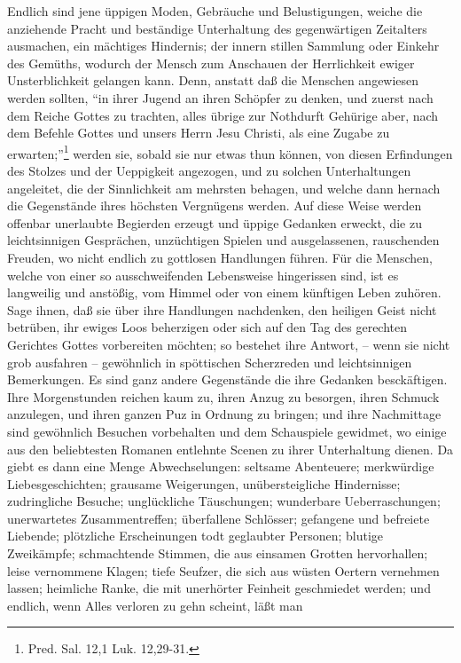 Endlich sind jene üppigen Moden, Gebräuche und Belustigungen, weiche die
anziehende Pracht und beständige Unterhaltung des gegenwärtigen Zeitalters
ausmachen, ein mächtiges Hindernis; der innern stillen Sammlung oder Einkehr des
Gemüths, wodurch der Mensch zum Anschauen der Herrlichkeit ewiger
Unsterblichkeit gelangen kann. Denn, anstatt daß die Menschen angewiesen werden
sollten, "`in ihrer Jugend an ihren Schöpfer zu denken, und zuerst nach dem
Reiche Gottes zu trachten, alles übrige zur Nothdurft Gehürige aber, nach dem
Befehle Gottes und unsers Herrn Jesu Christi, als eine Zugabe zu
erwarten;"'\footnote{Pred. Sal. 12,1 Luk. 12,29-31.} werden sie, sobald sie nur
etwas thun können, von diesen Erfindungen des Stolzes und der Ueppigkeit
angezogen, und zu solchen Unterhaltungen angeleitet, die der Sinnlichkeit am
mehrsten behagen, und welche dann hernach die Gegenstände ihres höchsten
Vergnügens werden. Auf diese Weise werden offenbar unerlaubte Begierden erzeugt
und üppige Gedanken erweckt, die zu leichtsinnigen Gesprächen, unzüchtigen
Spielen und ausgelassenen, rauschenden Freuden, wo nicht endlich zu gottlosen
Handlungen führen. Für die Menschen, welche von einer so ausschweifenden
Lebensweise hingerissen sind, ist es langweilig und anstößig, vom Himmel oder
von einem künftigen Leben zuhören. Sage ihnen, daß sie über ihre Handlungen
nachdenken, den heiligen Geist nicht betrüben, ihr ewiges Loos beherzigen oder
sich auf den Tag des gerechten Gerichtes Gottes vorbereiten möchten; so bestehet
ihre Antwort, -- wenn sie nicht grob ausfahren -- gewöhnlich in spöttischen
Scherzreden und leichtsinnigen Bemerkungen. Es sind ganz andere Gegenstände die
ihre Gedanken besckäftigen. Ihre Morgenstunden reichen kaum zu, ihren Anzug zu
besorgen, ihren Schmuck anzulegen, und ihren ganzen Puz in Ordnung zu bringen;
und ihre Nachmittage sind gewöhnlich Besuchen vorbehalten und dem Schauspiele
gewidmet, wo einige aus den beliebtesten Romanen entlehnte Scenen zu ihrer
Unterhaltung dienen. Da giebt es dann eine Menge Abwechselungen: seltsame
Abenteuere; merkwürdige Liebesgeschichten; grausame Weigerungen,
unübersteigliche Hindernisse; zudringliche Besuche; unglückliche Täuschungen;
wunderbare Ueberraschungen; unerwartetes Zusammentreffen; überfallene Schlösser;
gefangene und befreiete Liebende; plötzliche Erscheinungen todt geglaubter
Personen; blutige Zweikämpfe; schmachtende Stimmen, die aus einsamen Grotten
hervorhallen; leise vernommene Klagen; tiefe Seufzer, die sich aus wüsten
Oertern vernehmen lassen; heimliche Ranke, die mit unerhörter Feinheit
geschmiedet werden; und endlich, wenn Alles verloren zu gehn scheint, läßt man
